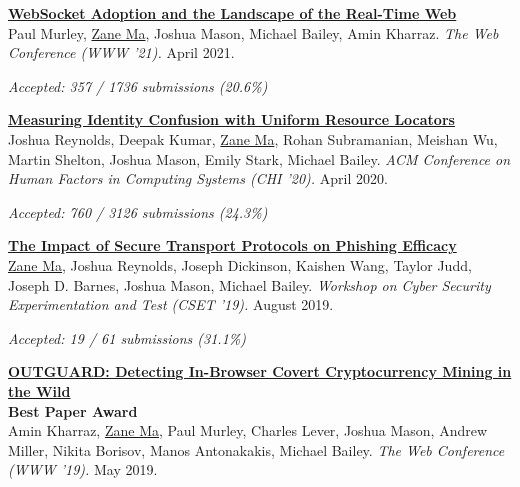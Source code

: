 \documentclass[10pt,singlecolumn]{article} %
\begin{document}

\textbf{\href{https://zanema.com/papers/www21_websockets.pdf}{WebSocket Adoption and the Landscape of the Real-Time Web}}\\
Paul Murley, \underline{Zane Ma}, Joshua Mason, Michael Bailey, Amin Kharraz.
\textit{The Web Conference (WWW '21).} April 2021.

{\raggedleft\textit{Accepted: 357 / 1736 submissions (20.6\%)}\par}
\vspace{6pt}


\textbf{\href{https://zanema.com/papers/chi20_urlconfusion.pdf}{Measuring Identity Confusion with Uniform Resource Locators}}\\
Joshua Reynolds, Deepak Kumar, \underline{Zane Ma}, Rohan Subramanian, Meishan Wu, Martin Shelton, Joshua Mason, Emily Stark, Michael Bailey.
\textit{ACM Conference on Human Factors in Computing Systems (CHI '20).} April 2020.

{\raggedleft\textit{Accepted: 760 / 3126 submissions (24.3\%)}\par}
\vspace{6pt}


\textbf{\href{https://zanema.com/papers/cset19_httpsphishing.pdf}{The Impact of Secure Transport Protocols on Phishing Efficacy}}\\
\underline{Zane Ma}, Joshua Reynolds, Joseph Dickinson, Kaishen Wang, Taylor Judd, Joseph D. Barnes, Joshua Mason, Michael Bailey.
\textit{Workshop on Cyber Security Experimentation and Test (CSET '19).} August 2019.

{\raggedleft\textit{Accepted: 19 / 61 submissions (31.1\%)}\par}
\vspace{6pt}


\textbf{\href{https://zanema.com/papers/www19_cryptojacking.pdf}{OUTGUARD: Detecting In-Browser Covert Cryptocurrency Mining in the Wild}}\\
    \textbf{\color{headings}Best Paper Award}\\
Amin Kharraz, \underline{Zane Ma}, Paul Murley, Charles Lever, Joshua Mason, Andrew Miller,
Nikita Borisov, Manos Antonakakis, Michael Bailey. 
\textit{The Web Conference (WWW '19).} May 2019.
\end{document}
